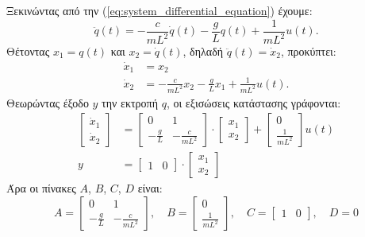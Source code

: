 \documentclass[a4paper,12pt]{article}
\begin{document}
Ξεκινώντας από την (\ref{eq:system_differential_equation}) έχουμε:
\begin{equation}
    \ddot{q}(t) = -\frac{c}{mL^2}\dot{q}(t) -\frac{g}{L}q(t) +\frac{1}{mL^2} u(t).
    \label{eq:system_differential_equation2}
\end{equation}
Θέτοντας $x_1 = q(t)$ και $x_2 = \dot{q}(t)$, δηλαδή $\ddot{q}(t) = \dot{x}_2$, προκύπτει:
\begin{equation}
\begin{aligned}
    \dot{x}_1 &= x_2 \\
    \dot{x}_2 &= -\frac{c}{mL^2}x_2 -\frac{g}{L}x_1 +\frac{1}{mL^2} u(t).
    \label{eq:system_states2}
\end{aligned}
\end{equation}
Θεωρώντας έξοδο $y$ την εκτροπή $q$, οι εξισώσεις κατάστασης γράφονται:
\begin{equation}
\begin{aligned}
    \left[
    \begin{matrix}
        \dot{x}_1 \\
        \dot{x}_2
    \end{matrix}
    \right]
    &=
    \left[
    \begin{matrix}
        0 & 1 \\
        -\frac{g}{L} & -\frac{c}{mL^2}
    \end{matrix}
    \right]
    \cdot
    \left[
    \begin{matrix}
        x_1 \\
        x_2
    \end{matrix}
    \right]
    +
    \left[
    \begin{matrix}
        0 \\
        \frac{1}{mL^2}
    \end{matrix}
    \right]
    u(t)
    \\
    y &= 
    \left[
    \begin{matrix}
        1 & 0
    \end{matrix}
    \right]
    \cdot
    \left[
    \begin{matrix}
        x_1 \\
        x_2
    \end{matrix}
    \right]
    \label{eq:system_states_final}
\end{aligned}
\end{equation}
Άρα οι πίνακες $A$, $B$, $C$, $D$ είναι:
\begin{equation}
    A = 
    \left[
    \begin{matrix}
        0 & 1 \\
        -\frac{g}{L} & -\frac{c}{mL^2}
    \end{matrix}
    \right], \quad
    B = 
    \left[
    \begin{matrix}
        0 \\
        \frac{1}{mL^2}
    \end{matrix}
    \right], \quad
    C = 
    \left[
    \begin{matrix}
        1 & 0
    \end{matrix}
    \right], \quad
    D = 0
    \label{eq:system_states_matrices}
\end{equation}
\end{document}

